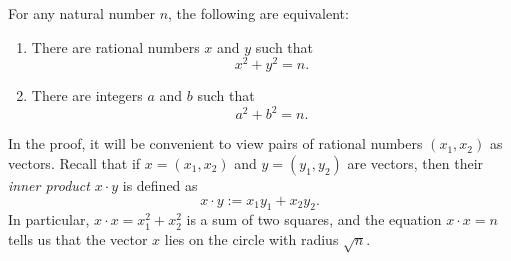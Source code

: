\begin{theorem}\label{theorem:aubrys-theorem}
  For any natural number $n$, the following are equivalent:
  \begin{enumerate}
  \item There are rational numbers $x$ and $y$ such that
    \begin{equation*}
      x^2+y^2=n.
    \end{equation*}
  \item There are integers $a$ and $b$ such that
    \begin{equation*}
      a^2+b^2=n.
    \end{equation*}
  \end{enumerate}
\end{theorem}

In the proof, it will be convenient to view pairs of rational numbers $(x_1,x_2)$ as vectors. Recall that if $x=(x_1,x_2)$ and $y=(y_1,y_2)$ are vectors, then their \emph{inner product} $x\cdot y$ is defined as
\begin{equation*}
  x\cdot y := x_1y_1+x_2y_2.
\end{equation*}
In particular, $x\cdot x=x_1^2+x_2^2$ is a sum of two squares, and the equation $x\cdot x=n$ tells us that the vector $x$ lies on the circle with radius $\sqrt{n}$.


